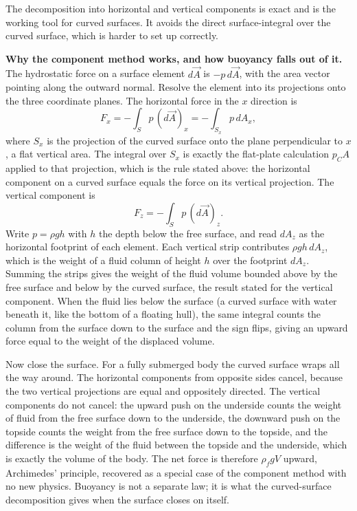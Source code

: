 The decomposition into horizontal and vertical components is
exact and is the working tool for curved surfaces. It avoids the
direct surface-integral over the curved surface, which is harder
to set up correctly.

\begin{mastery}
\textbf{Why the component method works, and how buoyancy falls out of
it.} The hydrostatic force on a surface element $d\vec{A}$ is $-p\,d\vec{A}$,
with the area vector pointing along the outward normal. Resolve the
element into its projections onto the three coordinate planes. The
horizontal force in the $x$ direction is
\[
F_x = -\int_S p\, (d\vec{A})_x = -\int_{S_x} p\,dA_x,
\]
where $S_x$ is the projection of the curved surface onto the plane
perpendicular to $x$, a flat vertical area. The integral over $S_x$ is
exactly the flat-plate calculation $p_C A$ applied to that projection,
which is the rule stated above: the horizontal component on a curved
surface equals the force on its vertical projection. The vertical
component is
\[
F_z = -\int_S p\, (d\vec{A})_z.
\]
Write $p = \rho g h$ with $h$ the depth below the free surface, and read
$dA_z$ as the horizontal footprint of each element. Each vertical strip
contributes $\rho g h\,dA_z$, which is the weight of a fluid column of
height $h$ over the footprint $dA_z$. Summing the strips gives the weight
of the fluid volume bounded above by the free surface and below by the
curved surface, the result stated for the vertical component. When the
fluid lies below the surface (a curved surface with water beneath it, like
the bottom of a floating hull), the same integral counts the column from
the surface down to the surface and the sign flips, giving an upward
force equal to the weight of the displaced volume.

Now close the surface. For a fully submerged body the curved surface
wraps all the way around. The horizontal components from opposite sides
cancel, because the two vertical projections are equal and oppositely
directed. The vertical components do not cancel: the upward push on the
underside counts the weight of fluid from the free surface down to the
underside, the downward push on the topside counts the weight from the
free surface down to the topside, and the difference is the weight of the
fluid between the topside and the underside, which is exactly the volume
of the body. The net force is therefore $\rho_f g V$ upward, Archimedes'
principle, recovered as a special case of the component method with no
new physics. Buoyancy is not a separate law; it is what the curved-surface
decomposition gives when the surface closes on itself.
\end{mastery}

